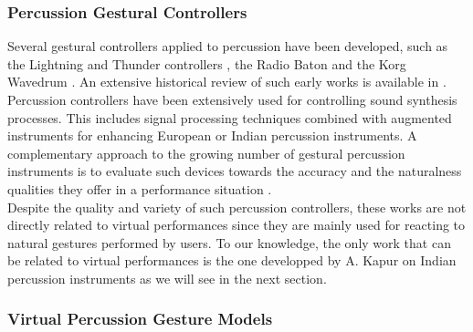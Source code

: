 {{			\subsubsection{Percussion Gestural Controllers}
			\label{subsec:SMP_CMC_PC}

Several gestural controllers applied to percussion have been developed, such as the Lightning and Thunder controllers , the Radio Baton  and the Korg Wavedrum . An extensive historical review of such early works is available in .\\

Percussion controllers have been extensively used for controlling sound synthesis processes. This includes signal processing techniques combined with augmented instruments for enhancing European  or Indian  percussion instruments. A complementary approach to the growing number of gestural percussion instruments is to evaluate such devices towards the accuracy and the naturalness qualities they offer in a performance situation .\\

Despite the quality and variety of such percussion controllers, these works are not directly related to virtual performances since they are mainly used for reacting to natural gestures performed by users. To our knowledge, the only work that can be related to virtual performances is the one developped by A. Kapur on Indian percussion instruments as we will see in the next section.




			\subsubsection{Virtual Percussion Gesture Models}
			\label{subsec:SMP_CMC_VM}

}}
